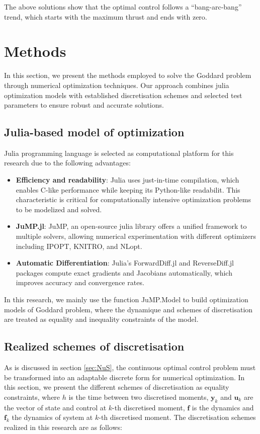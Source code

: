 \documentclass{article}
\begin{document}
The above solutions show that the optimal control follows a ``bang-arc-bang'' trend, which starts with the maximum thrust and ends with zero.


\clearpage

\section{Methods}
In this section, we present the methods employed to solve the Goddard problem through numerical optimization techniques. Our approach combines julia optimization models with established discretisation schemes and selected test parameters to ensure robust and accurate solutions.

\subsection{Julia-based model of optimization}
Julia programming language is selected as computational platform for this research due to the following advantages:
\begin{itemize}
    \item \textbf{Efficiency and readability}: Julia uses just-in-time compilation, which enables C-like performance while keeping its Python-like readabilit. This characteristic is critical for computationally intensive optimization problems to be modelized and solved.
    \item \textbf{JuMP.jl}: JuMP, an open-source julia library offers a unified framework to multiple solvers, allowing numerical experimentation with different optimizers including IPOPT, KNITRO, and NLopt.
    \item \textbf{Automatic Differentiation}: Julia's ForwardDiff.jl and ReverseDiff.jl packages compute exact gradients and Jacobians automatically, which improves accuracy and convergence rates.
\end{itemize}

In this research, we mainly use the function JuMP.Model to build optimization models of Goddard problem, where the dynamique and schemes of discretisation are treated as equality and inequality constraints of the model.
\subsection{Realized schemes of discretisation}
As is discussed in section \ref{sec:NuS}, the continuous optimal control problem must be transformed into an adaptable discrete form for numerical optimization. In this section, we present the different schemes of discretisation as equality constraints, where $h$ is the time between two discretised moments, $\textbf{y}_k$ and $\textbf{u}_k$ are the vector of state and control at $k$-th discretised moment, $\textbf{f}$ is the dynamics and $\textbf{f}_k$ the dynamics of system at $k$-th discretised moment. The discretisation schemes realized in this research are as follows:
\end{document}
